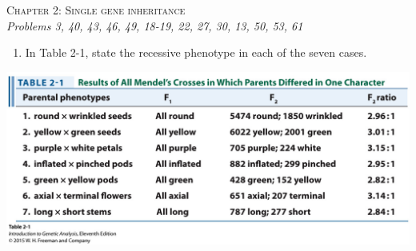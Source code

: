 \documentclass[11pt,]{article}
\providecommand{\tightlist}{%
  \setlength{\itemsep}{0pt}\setlength{\parskip}{0pt}}
\begin{document}
\begin{center}
\Large{\textsc{Chapter 2: Single gene
inheritance}}\\ \small{\textit{Problems 3, 40, 43, 46, 49, 18-19, 22,
27, 30, 13, 50, 53, 61}}\\
\vspace*{\baselineskip}
\end{center}

\begin{blackbox}

\begin{enumerate}
\def\labelenumi{\arabic{enumi}.}
\setcounter{enumi}{2}
\tightlist
\item
  In Table 2-1, state the recessive phenotype in each of the seven
  cases.
\end{enumerate}

\hfill\break

\begin{center}\includegraphics[width=0.65\linewidth,]{input/table_02_01} \end{center}

\vspace{14cm}

\end{blackbox}
\end{document}
